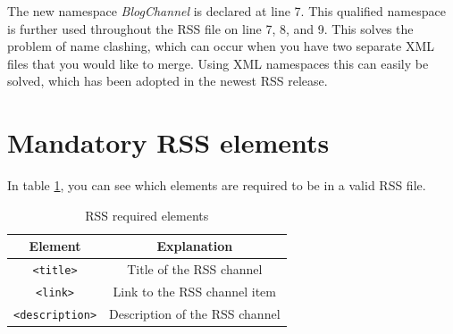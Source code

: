 The new namespace \textit{BlogChannel} is declared at line 7. This qualified namespace is further used throughout the RSS file on line 7, 8, and 9. This solves the problem of name clashing, which can occur when you have two separate XML files that you would like to merge. Using XML namespaces this can easily be solved, which has been adopted in the newest RSS release.

\section{Mandatory RSS elements}
\label{sec:mandatory-rss-elements}
In table \ref{table:mandatory-rss-elements}, you can see which elements are required to be in a valid RSS file.

\begin{table}[ht]
\begin{tabular}{c | c}
Element & Explanation \\ \hline
\texttt{<title>} & Title of the RSS channel \\ \hline
\texttt{<link>} & Link to the RSS channel item \\ \hline
\texttt{<description>} & Description of the RSS channel \\ \hline 
\end{tabular}
\caption{RSS required elements}
\label{table:mandatory-rss-elements}
\end{table}
